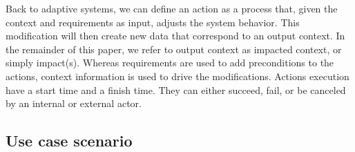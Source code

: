 Back to adaptive systems, we can define an action as a process that, given the context and requirements as input, adjusts the system behavior.
This modification will then create new data that correspond to an output context. In the remainder of this paper, we refer to output context as impacted context, or simply impact(s).
Whereas requirements are used to add preconditions to the actions, context information is used to drive the modifications.
Actions execution have a start time and a finish time. They can either succeed, fail, or be canceled by an internal or external actor.


\subsection{Use case scenario}